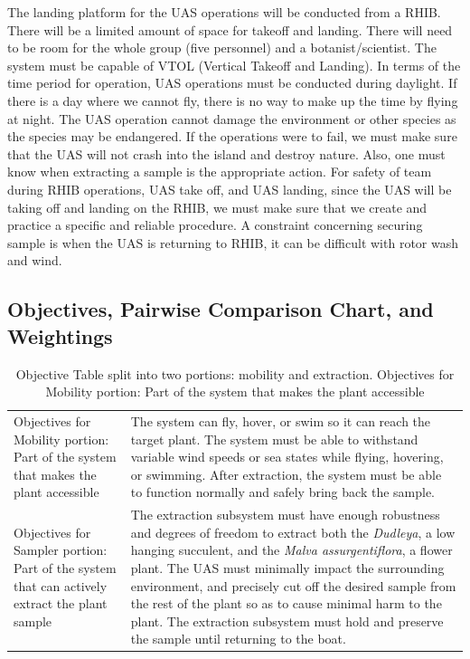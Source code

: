 \documentclass{wrcecapstone}
\newcommand{\Dudleya}{\emph{Dudleya}}
\newcommand{\Malvaassurgentiflora}{\emph{Malva assurgentiflora}}
\begin{document}
The landing platform for the UAS operations will be conducted from a RHIB. There will be a limited amount of space for takeoff and landing. There will need to be room for the whole group (five personnel) and a botanist/scientist.  The system must be capable of VTOL (Vertical Takeoff and Landing). In terms of the time period for operation, UAS operations must be conducted during daylight. If there is a day where we cannot fly, there is no way to make up the time by flying at night. The UAS operation cannot damage the environment or other species as the species may be endangered. If the operations were to fail, we must make sure that the UAS will not crash into the island and destroy nature.  Also, one must know when extracting a sample is the appropriate action. For safety of team during RHIB operations, UAS take off, and UAS landing, since the UAS will be taking off and landing on the RHIB, we must make sure that we create and practice a specific and reliable procedure. A constraint concerning securing sample is when the UAS is returning to RHIB, it can be difficult with rotor wash and wind. 

\subsection{Objectives, Pairwise Comparison Chart, and Weightings} 
\begin{table}
\caption{Objective Table split into two portions: mobility and extraction. Objectives for Mobility portion: Part of the system that makes the plant accessible}
\label{tab:2.4.1}
\begin{center}
\begin{tabular}{p{}p{}}
\toprule
Objectives for Mobility portion: Part of the system that makes the plant accessible &%
The system can fly, hover, or swim so it can reach the target plant. The system must be able to withstand variable wind speeds or sea states while flying, hovering, or swimming. After extraction, the system must be able to function normally and safely bring back the sample. \\
Objectives for Sampler portion: Part of the system that can actively extract the plant sample &%
The extraction subsystem must have enough robustness and degrees of freedom to extract both the \Dudleya, a low hanging succulent, and the \Malvaassurgentiflora, a flower plant. The UAS must minimally impact the surrounding environment, and precisely cut off the desired sample from the rest of the plant so as to cause minimal harm to the plant. The extraction subsystem must hold and preserve the sample until returning to the boat. \\
\bottomrule
\end{tabular}
\end{center}
\end{table}
\end{document}
